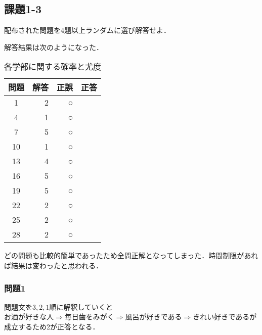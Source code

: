 \documentclass[12pt]{jarticle}
\begin{document}
\subsection{課題1-3}
\begin{shadebox}
    \quad 配布された問題を4題以上ランダムに選び解答せよ．
\end{shadebox}
\vspace{\baselineskip}
解答結果は次のようになった．
\clearpage
\begin{table}[h]
    \centering
    \caption{各学部に関する確率と尤度}
    \begin{tabular}{|c|r|r|r|} \hline
        問題 & \multicolumn{1}{|c|}{解答} & \multicolumn{1}{|c|}{正誤} & \multicolumn{1}{|c|}{正答} \\
        \hline\hline
        1    & 2                          & ○                          &                            \\ \hline
        4    & 1                          & ○                          &                            \\ \hline
        7    & 5                          & ○                          &                            \\ \hline
        10   & 1                          & ○                          &                            \\ \hline
        13   & 4                          & ○                          &                            \\ \hline
        16   & 5                          & ○                          &                            \\ \hline
        19   & 5                          & ○                          &                            \\ \hline
        22   & 2                          & ○                          &                            \\ \hline
        25   & 2                          & ○                          &                            \\ \hline
        28   & 2                          & ○                          &                            \\ \hline
    \end{tabular}
\end{table}
どの問題も比較的簡単であったため全問正解となってしまった．時間制限があれば結果は変わったと思われる．
\subsubsection{問題1}
問題文を$3,2,1$順に解釈していくと$お酒が好きな人 \Rightarrow 毎日歯をみがく
    \Rightarrow 風呂が好きである \Rightarrow きれい好きである$が成立するため2が正答となる．
\end{document}
